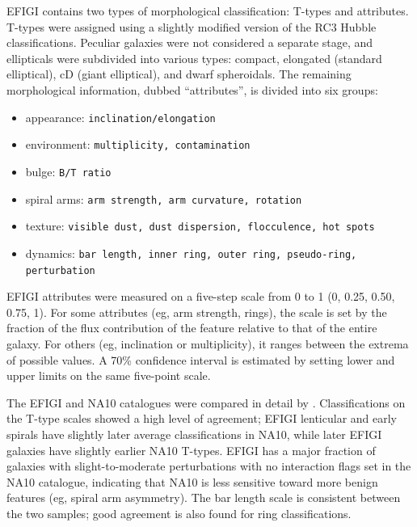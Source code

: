 \documentclass[useAMS,usenatbib]{mn2e}
\begin{document}
EFIGI contains two types of morphological classification: T-types and attributes. T-types were assigned using a slightly modified version of the RC3 Hubble classifications. Peculiar galaxies were not considered a separate stage, and ellipticals were subdivided into various types: compact, elongated (standard elliptical), cD (giant elliptical), and dwarf spheroidals. The remaining morphological information, dubbed ``attributes'', is divided into six groups:

\begin{itemize}
	\item appearance: {\tt inclination/elongation }
	\item environment: {\tt multiplicity, contamination}
	\item bulge: {\tt B/T ratio}
	\item spiral arms: {\tt arm strength, arm curvature, rotation}
	\item texture: {\tt visible dust, dust dispersion, flocculence, hot spots}
	\item dynamics: {\tt bar length, inner ring, outer ring, pseudo-ring, perturbation}
\end{itemize}

\noindent EFIGI attributes were measured on a five-step scale from 0 to 1 (0, 0.25, 0.50, 0.75, 1). For some attributes (eg, arm strength, rings), the scale is set by the fraction of the flux contribution of the feature relative to that of the entire galaxy. For others (eg, inclination or multiplicity), it ranges between the extrema of possible values. A 70\% confidence interval is estimated by setting lower and upper limits on the same five-point scale.

The EFIGI and NA10 catalogues were compared in detail by \citet{bai11}. Classifications on the T-type scales showed a high level of agreement; EFIGI lenticular and early spirals have slightly later average classifications in NA10, while later EFIGI galaxies have slightly earlier NA10 T-types. EFIGI has a major fraction of galaxies with slight-to-moderate perturbations with no interaction flags set in the NA10 catalogue, indicating that NA10 is less sensitive toward more benign features (eg, spiral arm asymmetry). The bar length scale is consistent between the two samples; good agreement is also found for ring classifications. 

\end{document}
